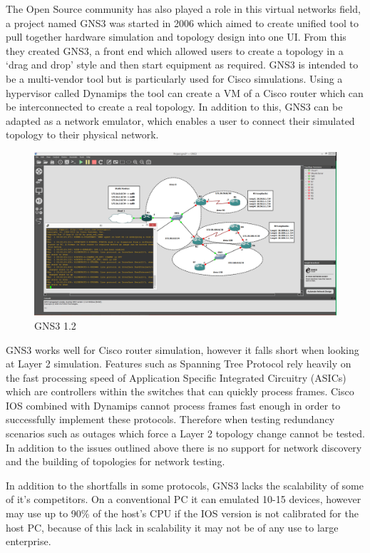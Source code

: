 \documentclass[11pt]{report}
\begin{document}
The Open Source community has also played a role in this virtual networks field, a project named GNS3 \citep{GNS31.2} was started in 2006 which aimed to create  unified tool to pull together hardware simulation and topology design into one UI. From this they created GNS3, a front end which allowed users to create a topology in a ‘drag and drop’ style and then start equipment as required. GNS3 is intended to be a multi-vendor tool but is particularly used for Cisco simulations. Using a hypervisor called Dynamips the tool can create a VM of a Cisco router which can be interconnected to create a real topology. In addition to this, GNS3 can be adapted as a network emulator, which enables a user to connect their simulated topology to their physical network.

\begin{figure}[h!]
	\caption{GNS3 1.2}
	\centering
	\includegraphics[width=1\textwidth]{GNS3.png}
\end{figure}

GNS3 works well for Cisco router simulation, however it falls short when looking at Layer 2 simulation. Features such as Spanning Tree Protocol rely heavily on the fast processing speed of Application Specific Integrated Circuitry (ASICs) which are controllers within the switches that can quickly process frames. Cisco IOS combined with Dynamips cannot process frames fast enough in order to successfully implement these protocols. Therefore when testing redundancy scenarios such as outages which force a Layer 2 topology change cannot be tested. In addition to the issues outlined above there is no support for network discovery and the building of topologies for network testing.

In addition to the shortfalls in some protocols, GNS3 lacks the scalability of some of it's competitors. On a conventional PC it can emulated 10-15 devices, however may use up to 90\% of the host's CPU if the IOS version is not calibrated for the host PC, because of this lack in scalability it may not be of any use to large enterprise.
\end{document}
